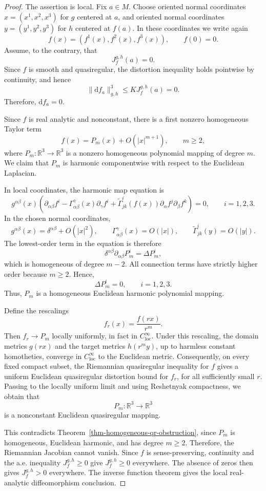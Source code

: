 \documentclass[10pt]{amsart}
\numberwithin{equation}{section}
\theoremstyle{definition}
\newcommand{\R}{\mathbb R}
\begin{document}
\begin{proof}
The assertion is local. Fix \(a\in M\). Choose oriented normal coordinates
\(x=(x^1,x^2,x^3)\) for \(g\) centered at \(a\), and oriented normal
coordinates \(y=(y^1,y^2,y^3)\) for \(h\) centered at \(f(a)\). In these
coordinates we write again
\[
        f(x)=(f^1(x),f^2(x),f^3(x)),
        \qquad f(0)=0.
\]
Assume, to the contrary, that
\[
        J_f^{g,h}(a)=0.
\]
Since \(f\) is smooth and quasiregular, the distortion inequality holds
pointwise by continuity, and hence
\[
        \|\mathrm{d}f_a\|_{g,h}^3\le KJ_f^{g,h}(a)=0.
\]
Therefore, \(\mathrm{d}f_a=0\).

Since \(f\) is real analytic and nonconstant, there is a first nonzero
homogeneous Taylor term
\[
        f(x)=P_m(x)+O(|x|^{m+1}),
        \qquad m\ge2,
\]
where \(P_m:\R^3\to\R^3\) is a nonzero homogeneous polynomial mapping of
degree \(m\). We claim that \(P_m\) is harmonic componentwise with respect to
the Euclidean Laplacian.

In local coordinates, the harmonic map equation is
\[
g^{\alpha\beta}(x)
\left(
\partial_{\alpha\beta}f^i
-\Gamma^\gamma_{\alpha\beta}(x)\partial_\gamma f^i
+\widetilde\Gamma^i_{jk}(f(x))\partial_\alpha f^j\partial_\beta f^k
\right)=0,
\qquad i=1,2,3.
\]
In the chosen normal coordinates,
\[
        g^{\alpha\beta}(x)=\delta^{\alpha\beta}+O(|x|^2),
        \qquad
        \Gamma^\gamma_{\alpha\beta}(x)=O(|x|),
        \qquad
        \widetilde\Gamma^i_{jk}(y)=O(|y|).
\]
The lowest-order term in the equation is therefore
\[
        \delta^{\alpha\beta}\partial_{\alpha\beta}P_m^i
        =\Delta P_m^i,
\]
which is homogeneous of degree \(m-2\). All connection terms have strictly
higher order because \(m\ge2\). Hence,
\[
        \Delta P_m^i=0,
        \qquad i=1,2,3.
\]
Thus, \(P_m\) is a homogeneous Euclidean harmonic polynomial mapping.

Define the rescalings
\[
        f_r(x)=\frac{f(rx)}{r^m}.
\]
Then \(f_r\to P_m\) locally uniformly, in fact in
\(C^\infty_{\operatorname{loc}}\). Under this rescaling, the domain metrics
\(g(rx)\) and the target metrics \(h(r^m y)\), up to harmless constant
homotheties, converge in \(C^\infty_{\operatorname{loc}}\) to the Euclidean
metric. Consequently, on every fixed compact subset, the Riemannian
quasiregular inequality for \(f\) gives a uniform Euclidean quasiregular
distortion bound for \(f_r\), for all sufficiently small \(r\). Passing to the
locally uniform limit and using Reshetnyak compactness, we obtain that
\[
        P_m:\R^3\to\R^3
\]
is a nonconstant Euclidean quasiregular mapping.

This contradicts Theorem~\ref{thm-homogeneous-qr-obstruction}, since \(P_m\)
is homogeneous, Euclidean harmonic, and has degree \(m\ge2\). Therefore, the
Riemannian Jacobian cannot vanish. Since \(f\) is sense-preserving, continuity
and the a.e. inequality \(J_f^{g,h}\ge0\) give \(J_f^{g,h}\ge0\) everywhere.
The absence of zeros then gives \(J_f^{g,h}>0\) everywhere. The inverse
function theorem gives the local real-analytic diffeomorphism conclusion.
\end{proof}
\end{document}
